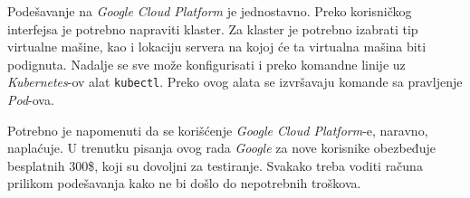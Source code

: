 Podešavanje na \textit{Google Cloud Platform} je jednostavno. Preko 
korisničkog interfejsa je potrebno napraviti klaster. Za klaster je 
potrebno izabrati tip virtualne mašine, kao i lokaciju servera na kojoj 
će ta virtualna mašina biti podignuta. Nadalje se sve može konfigurisati 
i preko komandne linije uz \textit{Kubernetes}-ov alat \texttt{kubectl}.
Preko ovog alata se izvršavaju komande sa pravljenje \textit{Pod}-ova.

Potrebno je napomenuti da se korišćenje \textit{Google Cloud Platform}-e,
naravno, naplaćuje. U trenutku pisanja ovog rada \textit{Google} za nove 
korisnike obezbeđuje besplatnih 300\$, koji su dovoljni za testiranje.
Svakako treba voditi računa prilikom podešavanja kako ne bi došlo do 
nepotrebnih troškova.


